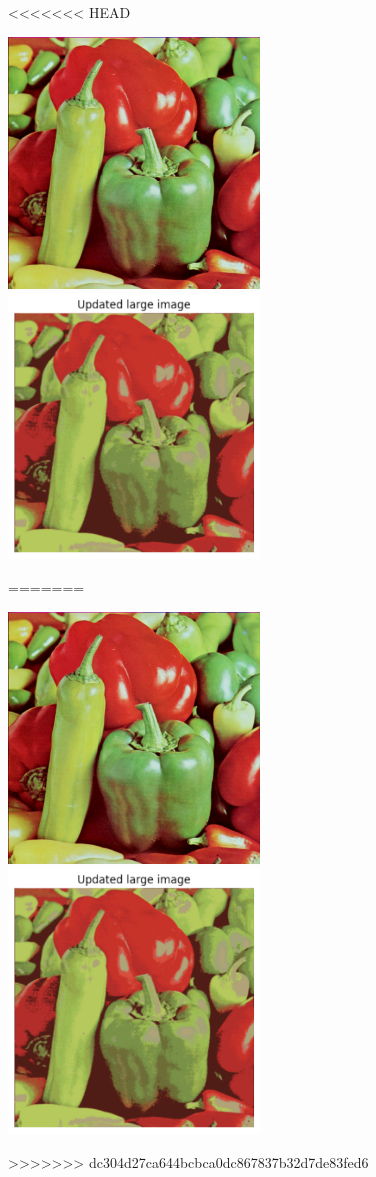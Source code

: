 <<<<<<< HEAD
\begin{answer}
\includegraphics[width=0.5\textwidth]{peppers-large.pdf}
\includegraphics[width=0.5\textwidth]{updated_large.pdf}
\end{answer}
=======
\begin{answer}
\includegraphics[width=0.5\textwidth]{peppers-large.pdf}
\includegraphics[width=0.5\textwidth]{updated_large.pdf}
\end{answer}
>>>>>>> dc304d27ca644bcbca0dc867837b32d7de83fed6
